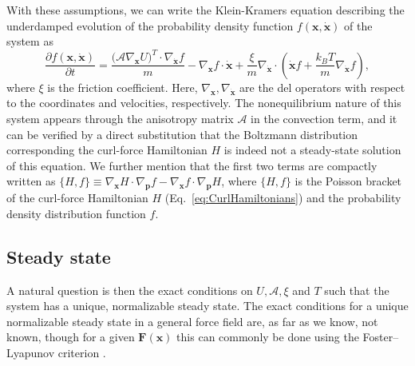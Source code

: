 With these assumptions, we can write the Klein-Kramers equation describing the underdamped evolution of the probability density function $f(\mathbf{x},\dot{\mathbf{x}})$ of the system as
\begin{equation}
    \label{eq:klein_kramers}
    \frac{\partial f(\mathbf{x}, \dot{\mathbf{x}})}{\partial t} =  \frac{\mathcal (\mathcal A\nabla_{\mathbf{x}} U)^T \cdot \nabla_{\dot{\mathbf{x}}}f}{m}-\nabla_{\mathbf{x}} f \cdot \dot{\mathbf{x}} + \frac{\xi}{m} \nabla_{\dot {\mathbf x}} \cdot(\dot {\mathbf x} f + \frac{k_B T}{m} \nabla_{\dot{\mathbf{x}}}f),
\end{equation}
where $\xi$ is the friction coefficient. Here, $\nabla_{\mathbf{x}},\nabla_{\dot {\mathbf x}}$ are the del operators with respect to the coordinates and velocities, respectively. The nonequilibrium nature of this system appears through the anisotropy matrix $\mathcal{A}$ in the convection term, and it can be verified by a direct substitution that the Boltzmann distribution corresponding the curl-force Hamiltonian $H$ is indeed not a steady-state solution of this equation. We further mention that the first two terms are compactly written as
$\{H,f\}\equiv\nabla_{\mathbf x} H \cdot \nabla_{\mathbf p}f-\nabla_{\mathbf x} f \cdot \nabla_{\mathbf p}H$,
where $\{H,f\}$ is the Poisson bracket of the curl-force Hamiltonian $H$ (Eq.~\ref{eq:CurlHamiltonians}) and the probability density distribution function $f$.

\subsection{{Steady state}}
A natural question is then the exact conditions on $U, \mathcal{A},\xi$ and $T$ such that the system has a unique, normalizable steady state. %
The exact conditions for a unique normalizable steady state in a general force field are, as far as we know, not known, though for a given $\mathbf{F}(\mathbf{x})$ this can commonly be done using the Foster--Lyapunov criterion \cite{dolbeault2018varphi}. 

